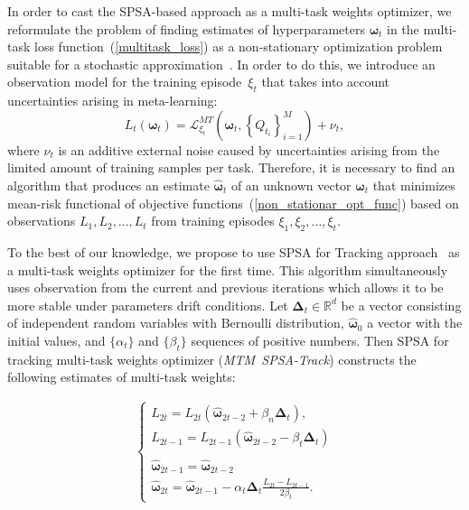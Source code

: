 \documentclass{article}
\begin{document}
In order to cast the SPSA-based approach as a multi-task weights optimizer, we reformulate the problem of finding estimates of hyperparameters $\boldsymbol{\omega}_t$ in the multi-task loss function~(\ref{multitask_loss}) as a non-stationary optimization problem suitable for a stochastic approximation~\cite{granichin2014simultaneous,boiarov2020simultaneous}. In order to do this, we introduce an observation model for the training episode~$\xi_t$ that takes into account uncertainties arising in meta-learning:
\begin{equation}\label{non_stationar_opt_func}
L_t(\boldsymbol{\omega}_t) = \mathcal{L}^{MT}_{\xi_t}(\boldsymbol{\omega}_t, \left\lbrace Q_{t_i} \right\rbrace_{i=1}^{M}) + \nu_t,
\end{equation}
where $\nu_t$ is an additive external noise caused by uncertainties arising from the limited amount of training samples per task. Therefore, it is necessary to find an algorithm that produces an estimate $\widehat{\boldsymbol{\omega}}_t$ of an unknown vector $\boldsymbol{\omega}_t$ that minimizes mean-risk functional of objective functions~(\ref{non_stationar_opt_func}) based on observations $L_1, L_2,\ldots,L_t$ from training episodes $\xi_1, \xi_2,\ldots,\xi_t$.















To the best of our knowledge, we propose to use SPSA for Tracking approach~\cite{granichin2014simultaneous} as a multi-task weights optimizer for the first time. This algorithm simultaneously uses observation from the current and previous iterations which allows it to be more stable under parameters drift conditions. Let $\boldsymbol{\Delta}_t \in {\mathbb R}^d$ be a vector consisting of independent random variables with Bernoulli distribution, $\widehat{\boldsymbol{\omega}}_{0}$ a vector with the initial values, and $\{\alpha_t\}$ and $\{\beta_t\}$ sequences of positive numbers. Then SPSA for tracking multi-task weights optimizer ({\it MTM~SPSA-Track}) constructs the following estimates of multi-task weights: 

\begin{eqnarray}\label{eq:fsl_spsa_track}
\begin{cases}
L_{2t} = L_{2t}(\widehat{\boldsymbol{\omega}}_{2t-2} + \beta_n \boldsymbol{\Delta}_t), \;\\ L_{2t-1} = L_{2t-1}(\widehat{\boldsymbol{\omega}}_{2t-2} - \beta_t \boldsymbol{\Delta}_t)
\\
\\
\widehat{\boldsymbol{\omega}}_{2t-1} = \widehat{\boldsymbol{\omega}}_{2t-2}
\\
\widehat{\boldsymbol{\omega}}_{2t} = \widehat{\boldsymbol{\omega}}_{2t-1} - \alpha_t \boldsymbol{\Delta}_t \frac{L_{2t} - L_{2t-1}}{2\beta_t}.
\end{cases}
\end{eqnarray}
\end{document}
